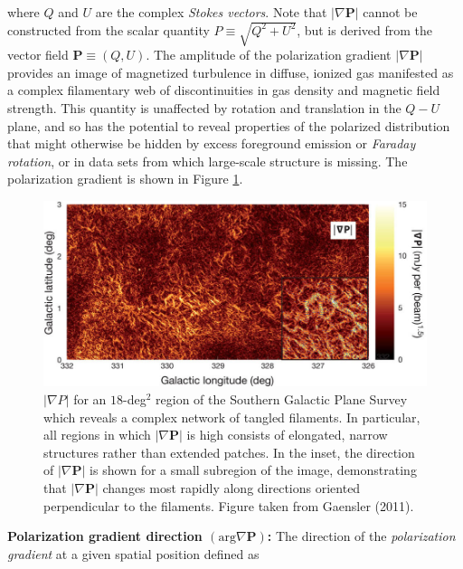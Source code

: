 \documentclass[a4paper,11pt]{article}
\begin{document}
{\noindent}where $Q$ and $U$ are the complex \textit{Stokes vectors}. Note that $\lvert\nabla \mathbf{P}\rvert$ cannot be constructed from the scalar quantity $P\equiv\sqrt{Q^2+U^2}$, but is derived from the vector field $\mathbf{P}\equiv(Q,U)$. The amplitude of the polarization gradient $\lvert\nabla \mathbf{P}\rvert$ provides an image of magnetized turbulence in diffuse, ionized gas manifested as a complex filamentary web of discontinuities in gas density and magnetic field strength. This quantity is unaffected by rotation and translation in the $Q-U$ plane, and so has the potential to reveal properties of the polarized distribution that might otherwise be hidden by excess foreground emission or \textit{Faraday rotation}, or in data sets from which large-scale structure is missing. The polarization gradient is shown in Figure \ref{figure:delP}.

\begin{figure}[h]
\begin{center}
\includegraphics[width=15cm]{figures/delP.jpg}
\caption{$\lvert\nabla P\rvert$ for an $18$-deg$^2$ region of the Southern Galactic Plane Survey which reveals a complex network of tangled filaments. In particular, all regions in which $\lvert\nabla \mathbf{P}\rvert$ is high consists of elongated, narrow structures rather than extended patches. In the inset, the direction of $\lvert\nabla\mathbf{P}\rvert$ is shown for a small subregion of the image, demonstrating that $\lvert\nabla\mathbf{P}\rvert$ changes most rapidly along directions oriented perpendicular to the filaments. Figure taken from Gaensler (2011).}
\label{figure:delP}
\end{center}
\end{figure}

{\noindent}\textbf{Polarization gradient direction $(\mathrm{arg}\nabla \mathbf{P})$:} The direction of the \textit{polarization gradient} at a given spatial position defined as
\end{document}
